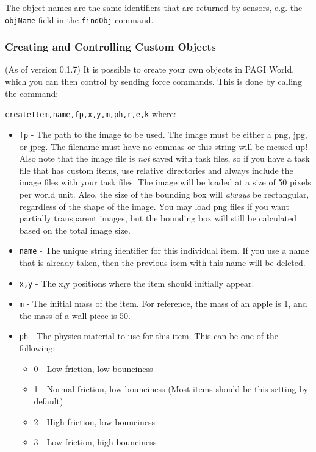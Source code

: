 The object names are the same identifiers that are returned by sensors, e.g. the \texttt{objName} field in the \texttt{findObj} command.

\subsubsection{Creating and Controlling Custom Objects}
\label{sect:custom}

(As of version 0.1.7) It is possible to create your own objects in PAGI World, which you can then control by sending force commands. This is done by calling the command:

\texttt{createItem,name,fp,x,y,m,ph,r,e,k} where:

\begin{itemize}
\item \texttt{fp} - The path to the image to be used. The image must be either a png, jpg, or jpeg. The filename must have no commas or this string will be messed up! Also note that the image file is \textit{not} saved with task files, so if you have a task file that has custom items, use relative directories and always include the image files with your task files. The image will be loaded at a size of 50 pixels per world unit. Also, the size of the bounding box will \textit{always} be rectangular, regardless of the shape of the image. You may load png files if you want partially transparent images, but the bounding box will still be calculated based on the total image size.
\item \texttt{name} - The unique string identifier for this individual item. If you use a name that is already taken, then the previous item with this name will be deleted.
\item \texttt{x,y} - The x,y positions where the item should initially appear.
\item \texttt{m} - The initial mass of the item. For reference, the mass of an apple is 1, and the mass of a wall piece is 50.
\item \texttt{ph} - The physics material to use for this item. This can be one of the following:
	\begin{itemize}
	\item 0 - Low friction, low bounciness
	\item 1 - Normal friction, low bounciness (Most items should be this setting by default)
	\item 2 - High friction, low bounciness
	\item 3 - Low friction, high bounciness

\end{itemize}
\end{itemize}
